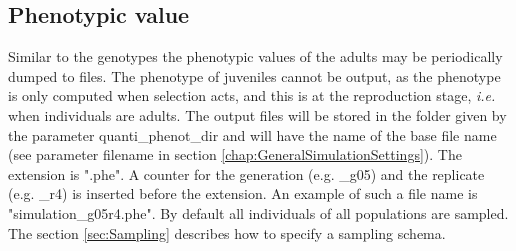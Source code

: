 \documentclass[letterpaper,12pt,oneside]{book}
\begin{document}
\subsection{Phenotypic value}\label{phenoQuanti}
Similar to the genotypes the phenotypic values of the adults may be periodically dumped to files. The phenotype of juveniles cannot be output, as the phenotype is only computed when selection acts, and this is at the reproduction stage, \textit{i.e.} when individuals are adults. The output files will be stored in the folder given by the parameter \textsf{quanti\_phenot\_dir} and will have the name of the base file name (see parameter \textsf{filename} in section \ref{chap:GeneralSimulationSettings}). The extension is ".phe". A counter for the generation (e.g. \_g05) and the replicate (e.g. \_r4) is inserted before the extension. An example of such a file name is \textsf{"simulation\_g05r4.phe"}. By default all individuals of all populations are sampled. The section \ref{sec:Sampling} describes how to specify a sampling schema.
\end{document}
